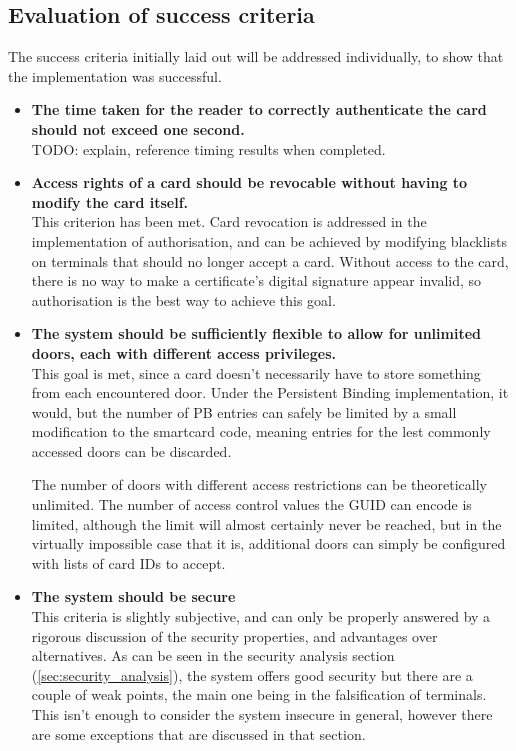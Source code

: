 \documentclass[12pt]{article}
\begin{document}
\subsection{Evaluation of success criteria}
\label{sec:success_criteria}

The success criteria initially laid out will be addressed individually, to show that the implementation was successful.
\begin{itemize}
	\item \textbf{The time taken for the reader to correctly authenticate the card should not exceed one second.}\\
	TODO: explain, reference timing results when completed.
	
	\item \textbf{Access rights of a card should be revocable without having to modify the card itself.}\\
	This criterion has been met. Card revocation is addressed in the implementation of authorisation, and can be achieved by modifying blacklists on terminals that should no longer accept a card. Without access to the card, there is no way to make a certificate's digital signature appear invalid, so authorisation is the best way to achieve this goal.
	
	\item \textbf{The system should be sufficiently flexible to allow for unlimited doors, each with different access privileges.}\\
	This goal is met, since a card doesn't necessarily have to store something from each encountered door. Under the Persistent Binding implementation, it would, but the number of PB entries can safely be limited by a small modification to the smartcard code, meaning entries for the lest commonly accessed doors can be discarded.
	
	The number of doors with different access restrictions can be theoretically unlimited. The number of access control values the GUID can encode is limited, although the limit will almost certainly never be reached, but in the virtually impossible case that it is, additional doors can simply be configured with lists of card IDs to accept.
	
	\item \textbf{The system should be secure}\\
	This criteria is slightly subjective, and can only be properly answered by a rigorous discussion of the security properties, and advantages over alternatives. As can be seen in the security analysis section (\ref{sec:security_analysis}), the system offers good security but there are a couple of weak points, the main one being in the falsification of terminals. This isn't enough to consider the system insecure in general, however there are some exceptions that are discussed in that section.
	

\end{itemize}
\end{document}
